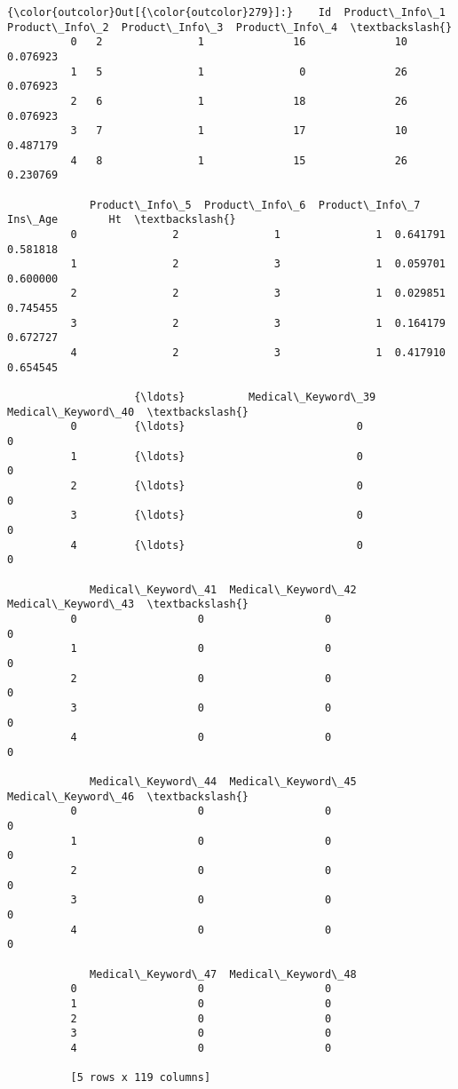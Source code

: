 \documentclass[11pt]{article}
\begin{document}
\begin{Verbatim}[commandchars=\\\{\}]
{\color{outcolor}Out[{\color{outcolor}279}]:}    Id  Product\_Info\_1  Product\_Info\_2  Product\_Info\_3  Product\_Info\_4  \textbackslash{}
          0   2               1              16              10        0.076923   
          1   5               1               0              26        0.076923   
          2   6               1              18              26        0.076923   
          3   7               1              17              10        0.487179   
          4   8               1              15              26        0.230769   
          
             Product\_Info\_5  Product\_Info\_6  Product\_Info\_7   Ins\_Age        Ht  \textbackslash{}
          0               2               1               1  0.641791  0.581818   
          1               2               3               1  0.059701  0.600000   
          2               2               3               1  0.029851  0.745455   
          3               2               3               1  0.164179  0.672727   
          4               2               3               1  0.417910  0.654545   
          
                    {\ldots}          Medical\_Keyword\_39  Medical\_Keyword\_40  \textbackslash{}
          0         {\ldots}                           0                   0   
          1         {\ldots}                           0                   0   
          2         {\ldots}                           0                   0   
          3         {\ldots}                           0                   0   
          4         {\ldots}                           0                   0   
          
             Medical\_Keyword\_41  Medical\_Keyword\_42  Medical\_Keyword\_43  \textbackslash{}
          0                   0                   0                   0   
          1                   0                   0                   0   
          2                   0                   0                   0   
          3                   0                   0                   0   
          4                   0                   0                   0   
          
             Medical\_Keyword\_44  Medical\_Keyword\_45  Medical\_Keyword\_46  \textbackslash{}
          0                   0                   0                   0   
          1                   0                   0                   0   
          2                   0                   0                   0   
          3                   0                   0                   0   
          4                   0                   0                   0   
          
             Medical\_Keyword\_47  Medical\_Keyword\_48  
          0                   0                   0  
          1                   0                   0  
          2                   0                   0  
          3                   0                   0  
          4                   0                   0  
          
          [5 rows x 119 columns]
\end{Verbatim}
\end{document}
